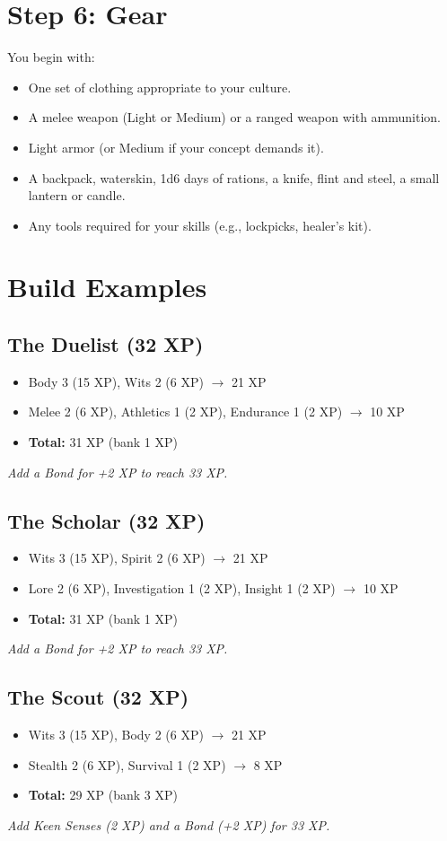 \documentclass[11pt]{book}
\begin{document}
\section{Step 6: Gear}

You begin with:
\begin{itemize}
  \item One set of clothing appropriate to your culture.
  \item A melee weapon (Light or Medium) or a ranged weapon with ammunition.
  \item Light armor (or Medium if your concept demands it).
  \item A backpack, waterskin, 1d6 days of rations, a knife, flint and steel, a small lantern or candle.
  \item Any tools required for your skills (e.g., lockpicks, healer's kit).
\end{itemize}

\section{Build Examples}

\subsection*{The Duelist (32 XP)}
\begin{itemize}
  \item Body 3 (15 XP), Wits 2 (6 XP) $\rightarrow$ 21 XP
  \item Melee 2 (6 XP), Athletics 1 (2 XP), Endurance 1 (2 XP) $\rightarrow$ 10 XP
  \item \textbf{Total:} 31 XP (bank 1 XP)
\end{itemize}
\textit{Add a Bond for +2 XP to reach 33 XP.}

\subsection*{The Scholar (32 XP)}
\begin{itemize}
  \item Wits 3 (15 XP), Spirit 2 (6 XP) $\rightarrow$ 21 XP
  \item Lore 2 (6 XP), Investigation 1 (2 XP), Insight 1 (2 XP) $\rightarrow$ 10 XP
  \item \textbf{Total:} 31 XP (bank 1 XP)
\end{itemize}
\textit{Add a Bond for +2 XP to reach 33 XP.}

\subsection*{The Scout (32 XP)}
\begin{itemize}
  \item Wits 3 (15 XP), Body 2 (6 XP) $\rightarrow$ 21 XP
  \item Stealth 2 (6 XP), Survival 1 (2 XP) $\rightarrow$ 8 XP
  \item \textbf{Total:} 29 XP (bank 3 XP)
\end{itemize}
\textit{Add Keen Senses (2 XP) and a Bond (+2 XP) for 33 XP.}
\end{document}
